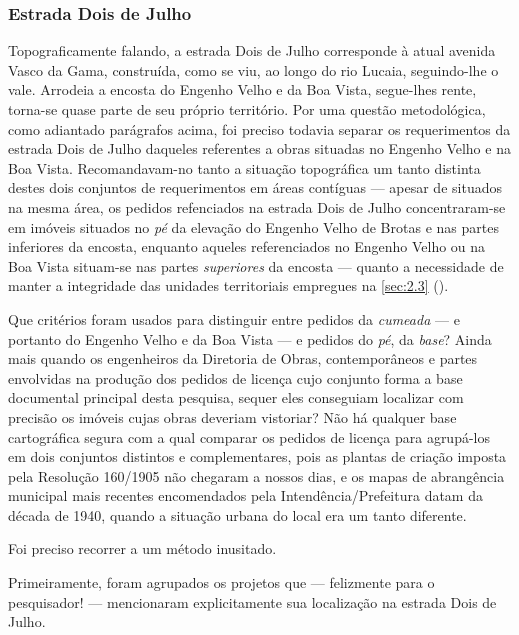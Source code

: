 \subsubsection{Estrada Dois de Julho}


Topograficamente falando, a estrada Dois de Julho corresponde à atual avenida Vasco da Gama, construída, como se viu, ao longo do rio Lucaia, seguindo-lhe o vale. Arrodeia a encosta do Engenho Velho e da Boa Vista, segue-lhes rente, torna-se quase parte de seu próprio território.  Por uma questão metodológica, como adiantado parágrafos acima, foi preciso todavia separar os requerimentos da estrada Dois de Julho daqueles referentes a obras situadas no Engenho Velho e na Boa Vista. Recomandavam-no tanto a situação topográfica um tanto distinta destes dois conjuntos de requerimentos em áreas contíguas --- apesar de situados na mesma área, os pedidos refenciados na estrada Dois de Julho concentraram-se em imóveis situados no \textit{pé} da elevação do Engenho Velho de Brotas e nas partes inferiores da encosta, enquanto aqueles referenciados no Engenho Velho ou na Boa Vista situam-se nas partes \textit{superiores} da encosta --- quanto a necessidade de manter a integridade das unidades territoriais empregues na \autoref{sec:2.3} (\pageref{sec:2.3}).

Que critérios foram usados para distinguir entre pedidos da \textit{cumeada} --- e portanto do Engenho Velho e da Boa Vista --- e pedidos do \textit{pé}, da \textit{base}? Ainda mais quando os engenheiros da Diretoria de Obras, contemporâneos e partes envolvidas na produção dos pedidos de licença cujo conjunto forma a base documental principal desta pesquisa, sequer eles conseguiam localizar com precisão os imóveis cujas obras deveriam vistoriar? Não há qualquer base cartográfica segura com a qual comparar os pedidos de licença para agrupá-los em dois conjuntos distintos e complementares, pois as plantas de criação imposta pela Resolução 160/1905 não chegaram a nossos dias, e os mapas de abrangência municipal mais recentes encomendados pela Intendência/Prefeitura datam da década de 1940, quando a situação urbana do local era um tanto diferente. 

Foi preciso recorrer a um método inusitado. 

Primeiramente, foram agrupados os projetos que --- felizmente para o pesquisador! --- mencionaram explicitamente sua localização na estrada Dois de Julho. 


